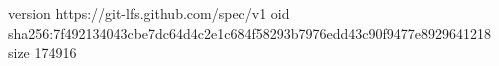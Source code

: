 version https://git-lfs.github.com/spec/v1
oid sha256:7f492134043cbe7dc64d4c2e1c684f58293b7976edd43c90f9477e8929641218
size 174916
